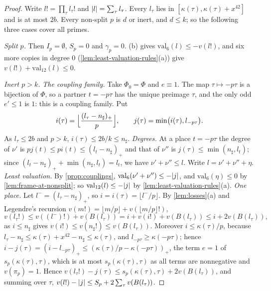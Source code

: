 \begin{proof}
Write $l!=\prod_\tau l_\tau!$ and $\lvert l\rvert=\sum_\tau l_\tau$. Every $l_\tau$ lies in $[\kappa(\tau),\kappa(\tau)+x^{42}]$ and is at most $2b$. Every non-split $p$ is $d$ or inert, and $d\le k$; so the following three cases cover all primes.

\emph{Split $p$.} Then $I_p=\emptyset$, $S_p=0$ and $\gamma_p=0$. (b) gives $\mathrm{val}_6(l)\le-v(l!)$, and six more copies in degree $0$ (\cref{lem:least-valuation-rules}(a)) give $v(l!)+\mathrm{val}_{12}(l)\le0$.

\emph{Inert $p>k$.} \emph{The coupling family.} Take $\Phi_0=\Phi$ and $e\equiv1$. The map $\tau\mapsto-p\tau$ is a bijection of $\Phi$, so a partner $t=-p\tau$ has the unique preimage $\tau$, and the only odd $e'\le1$ is $1$: this is a coupling family. Put
\[
  i(\tau)=\Bigl\lfloor\frac{(l_\tau-n_\sharp)_+}p\Bigr\rfloor,\qquad j(\tau)=\min\bigl(i(\tau),l_{-p\tau}\bigr).
\]
As $l_\tau\le2b$ and $p>k$, $i(\tau)\le2b/k\le n_\sharp$. \emph{Degrees.} At a place $t=-p\tau$ the degree of $\nu'$ is $pj(t)\le pi(t)\le(l_t-n_\sharp)_+$ and that of $\nu''$ is $j(\tau)\le\min(n_\sharp,l_t)$; since $(l_t-n_\sharp)_++\min(n_\sharp,l_t)=l_t$, we have $\nu'+\nu''\le l$. Write $l=\nu'+\nu''+\eta$. \emph{Least valuation.} By \cref{prop:couplings}, $\mathrm{val}_6(\nu'+\nu'')\le-\lvert j\rvert$, and $\mathrm{val}_6(\eta)\le0$ by \cref{lem:frame-at-nonsplit}; so $\mathrm{val}_{12}(l)\le-\lvert j\rvert$ by \cref{lem:least-valuation-rules}(a). \emph{One place.} Let $l^-=(l_\tau-n_\sharp)_+$, so $i=i(\tau)=\lfloor l^-/p\rfloor$. By \cref{lem:losses}(a) and Legendre's recursion $v(m!)=\lfloor m/p\rfloor+v(\lfloor m/p\rfloor!)$,
\[
  v(l_\tau!)\le v((l^-)!)+v(B(l_\tau))=i+v(i!)+v(B(l_\tau))\le i+2v(B(l_\tau)),
\]
as $i\le n_\sharp$ gives $v(i!)\le v(n_\sharp!)\le v(B(l_\tau))$. Moreover $i\le\kappa(\tau)/p$, because $l_\tau-n_\sharp\le\kappa(\tau)+x^{42}-n_\sharp\le\kappa(\tau)$, and $l_{-p\tau}\ge\kappa(-p\tau)$; hence $i-j(\tau)=(i-l_{-p\tau})_+\le(\kappa(\tau)/p-\kappa(-p\tau))_+$, the term $e=1$ of $s_p(\kappa(\tau),\tau)$, which is at most $s_p(\kappa(\tau),\tau)$ as all terms are nonnegative and $v(\pi_p)=1$. Hence $v(l_\tau!)-j(\tau)\le s_p(\kappa(\tau),\tau)+2v(B(l_\tau))$, and summing over $\tau$, $v(l!)-\lvert j\rvert\le S_p+2\sum_\tau v(B(l_\tau))$.


\end{proof}
